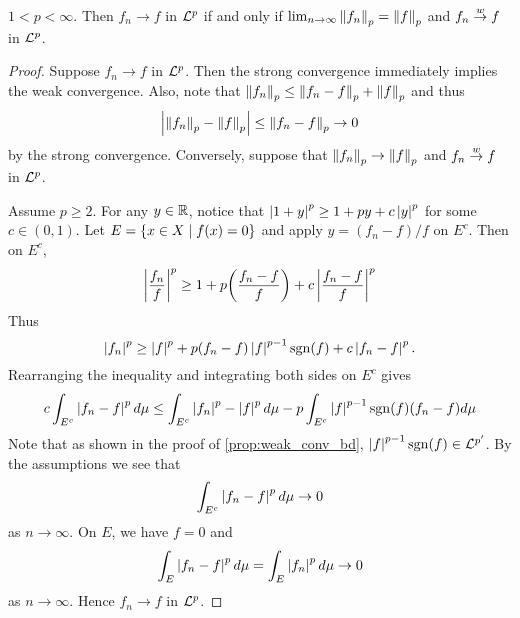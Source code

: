 \begin{theorem}
    $1<p<\infty$. Then $f_n\to f$ in $\mathcal{L}^p$ if and only if 
    $\lim_{n\to\infty} \left\lVert {f_n} \right\rVert_p = \left\lVert {f} \right\rVert_p$ and 
    $f_n\overset{w}{\to} f$ in $\mathcal{L}^p$.
\end{theorem}
\begin{proof}
    Suppose $f_n\to f$ in $\mathcal{L}^p$. Then the strong convergence 
    immediately implies the weak convergence. Also, note that 
    $\left\lVert {f_n} \right\rVert_p\leq\left\lVert {f_n-f} \right\rVert_p+\left\lVert {f} \right\rVert_p$ and thus 
    \begin{equation*}
        \left\lvert {\left\lVert {f_n} \right\rVert_p-\left\lVert {f} \right\rVert_p} \right\rvert \leq \left\lVert {f_n-f} \right\rVert_p\to 0
    \end{equation*}
    by the strong convergence. Conversely, suppose that 
    $\left\lVert {f_n} \right\rVert_p\to\left\lVert {f} \right\rVert_p$ and $f_n\overset{w}{\to} f$ in 
    $\mathcal{L}^p$. 
    
    Assume $p\geq 2$. For any $y\in\mathbb{R}$, notice that $\left\lvert {1+y} \right\rvert^p 
    \geq 1 + py + c\left\lvert {y} \right\rvert^p$ for some $c\in(0,1)$. Let 
    $E = \left\{ x\in X \;\middle\vert\; f(x) = 0 \right\}$ and apply $y = (f_n-f)/f$ 
    on $E^c$. Then on $E^c$,
    \begin{equation*}
        \abs{\frac{f_n}{f}}^p
        \geq 1 + p\pth{\frac{f_n-f}{f}} + c\abs{\frac{f_n-f}{f}}^p
    \end{equation*}
    Thus 
    \begin{equation*}
        \left\lvert {f_n} \right\rvert^p\geq \left\lvert {f} \right\rvert^p + p(f_n-f)\left\lvert {f} \right\rvert^{p-1}\operatorname{sgn}(f) + c\left\lvert {f_n-f} \right\rvert^p.
    \end{equation*}
    Rearranging the inequality and integrating both sides on 
    $E^c$ gives 
    \begin{equation*}
        c\int_{E^c} \left\lvert {f_n-f} \right\rvert^pd\mu 
        \leq \int_{E^c}\left\lvert {f_n} \right\rvert^p-\left\lvert {f} \right\rvert^pd\mu - p\int_{E^c}\left\lvert {f} \right\rvert^{p-1}\operatorname{sgn}(f)(f_n-f)d\mu
    \end{equation*}
    Note that as shown in the proof of \cref{prop:weak_conv_bd}, 
    $\left\lvert {f} \right\rvert^{p-1}\operatorname{sgn}(f)\in\mathcal{L}^{p'}$. By the assumptions we see 
    that 
    \begin{equation*}
        \int_{E^c} \left\lvert {f_n-f} \right\rvert^pd\mu\to 0
    \end{equation*}
    as $n\to\infty$. On $E$, we have $f = 0$ and 
    \begin{equation*}
        \int_E \left\lvert {f_n-f} \right\rvert^pd\mu = \int_E \left\lvert {f_n} \right\rvert^pd\mu \to 0
    \end{equation*}
    as $n\to\infty$. Hence $f_n\to f$ in $\mathcal{L}^p$.


\end{proof}
